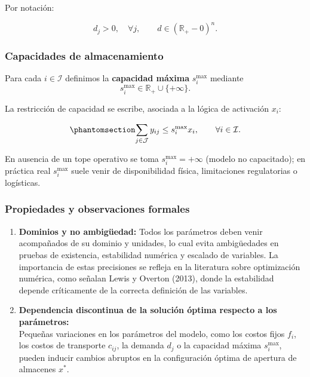 \documentclass[
  spanish,
  us-letterpaper,
]{scrreprt}
\numberwithin{equation}{section}
\begin{document}
Por notación:

\[
d_j>0,\quad \forall j,\qquad d\in(\mathbb{R}_{+}-{0})^n.
\]

\subsubsection{Capacidades de
almacenamiento}\label{capacidades-de-almacenamiento}

Para cada \(i\in\mathcal{I}\) definimos la \textbf{capacidad máxima}
\(s_i^{\max}\) mediante \[
s_i^{\max}\in\mathbb{R}_{+}\cup\{+\infty\}.
\]

La restricción de capacidad se escribe, asociada a la lógica de
activación \(x_i\):

\begin{equation}\phantomsection\label{eq-capacidad-smax}{
\sum_{j\in\mathcal{J}} y_{ij} \le s_i^{\max} x_i,\qquad \forall i\in\mathcal{I}.
}\end{equation}

En ausencia de un tope operativo se toma \(s_i^{\max}=+\infty\) (modelo
no capacitado); en práctica real \(s_i^{\max}\) suele venir de
disponibilidad física, limitaciones regulatorias o logísticas.

\subsubsection{Propiedades y observaciones
formales}\label{propiedades-y-observaciones-formales}

\begin{enumerate}
\def\labelenumi{\arabic{enumi}.}
\item
  \textbf{Dominios y no ambigüedad:} Todos los parámetros deben venir
  acompañados de su dominio y unidades, lo cual evita ambigüedades en
  pruebas de existencia, estabilidad numérica y escalado de variables.
  La importancia de estas precisiones se refleja en la literatura sobre
  optimización numérica, como señalan Lewis y Overton (2013), donde la
  estabilidad depende críticamente de la correcta definición de las
  variables.
\item
  \textbf{Dependencia discontinua de la solución óptima respecto a los
  parámetros:}\\
  Pequeñas variaciones en los parámetros del modelo, como los costos
  fijos \(f_i\), los costos de transporte \(c_{ij}\), la demanda \(d_j\)
  o la capacidad máxima \(s_i^{\max}\), pueden inducir cambios abruptos
  en la configuración óptima de apertura de almacenes \(x^*\).
\end{enumerate}
\end{document}
